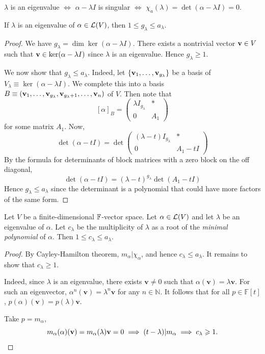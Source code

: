 \documentclass[a4paper,11pt]{article}
\begin{document}
\begin{remark}
	$ \lambda $ is an eigenvalue $\iff$ $\alpha-\lambda I$ is singular $\iff$ $\chi_a(\lambda) = \det (\alpha - \lambda I ) = 0$.  
\end{remark}

\begin{lemma}
	If \( \lambda \) is an eigenvalue of \( \alpha \in \mcL(V) \), then \( 1 \leq g_\lambda \leq a_\lambda \).
\end{lemma}
\begin{proof}
	We have \( g_\lambda = \dim \ker (\alpha - \lambda I) \).
	There exists a nontrivial vector \( \bfv \in V \) such that \( \bfv \in \ker(\alpha - \lambda I) \) since \( \lambda \) is an eigenvalue.
	Hence \( g_\lambda \geq 1 \).

	We now show that \( g_\lambda \leq a_\lambda \).
	Indeed, let \( \{\bfv_1, \dots, \bfv_{g_\lambda}\} \) be a basis of \( V_\lambda \equiv \ker (\alpha - \lambda I) \).
	We complete this into a basis \( B \equiv \qty(\bfv_1, \dots, \bfv_{g_\lambda}, \bfv_{g_\lambda + 1}, \dots, \bfv_n) \) of \( V \).
	Then note that
	\[
		[\alpha]_B = \begin{pmatrix}
			\lambda I_{g_\lambda} & * \\
			0                     & A_1
		\end{pmatrix}
	\]
	for some matrix \( A_1 \).
	Now,
	\[
		\det (\alpha - tI) = \det \begin{pmatrix}
			(\lambda - t) I_{g_\lambda} & *     \\
			0                           & A_1 - t I
		\end{pmatrix}
	\]
	By the formula for determinants of block matrices with a zero block on the off diagonal,
	\[
		\det (\alpha - tI) = (\lambda-t)^{g_\lambda} \det(A_1 - t I)
	\]
	Hence \( g_\lambda \leq a_\lambda \) since the determinant is a polynomial that could have more factors of the same form.
\end{proof}

\begin{lemma}
	Let \( V \) be a finite-dimensional \( \bbF \)-vector space.
	Let \( \alpha \in \mcL(V) \) and let \( \lambda \) be an eigenvalue of \( \alpha \).
	Let \( c_\lambda \) be the multiplicity of \( \lambda \) as a root of the \textit{minimal polynomial} of \( \alpha \).
	Then \( 1 \leq c_\lambda \leq a_\lambda \).
\end{lemma}
\begin{proof}
	By Cayley-Hamilton theorem, $ m_\alpha | \chi_\alpha $, and hence $ c_\lambda \le a_\lambda $. It remains to show that $ c_\lambda\ge 1 $. 
	
	Indeed, since $ \lambda $ is an eigenvalue, there exists $ \mathbf{v}\neq 0 $ such that $ \alpha(\mathbf{v}) = \lambda \mathbf{v} $. For such an eigenvector, $ \alpha^n (\mathbf{v}) = \lambda^n \mathbf{v} $ for any $ n \in \mathbb{N} $. 
	It follows that for all $ p\in \mathbb{F}[t] $, $ p(\alpha)(\mathbf{v}) = p(\lambda)\mathbf{v} $. 

	Take $p = m_\alpha$, 
	\[
		m_\alpha(\alpha)(\mathbf{v}) = m_\alpha(\lambda) \mathbf{v} = 0 \implies (t-\lambda) | m_\alpha \implies c_\lambda\ge 1. \qedhere
	\]
\end{proof}
\end{document}
